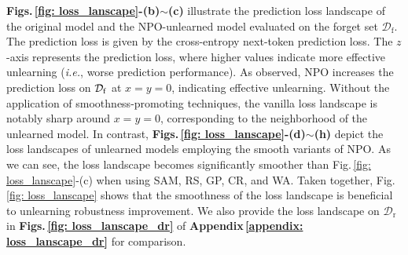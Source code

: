 \textbf{Figs.\,\ref{fig: loss_lanscape}-(b)$\sim$(c)} illustrate the prediction loss landscape of the original model and the NPO-unlearned model evaluated on the forget set $\mathcal{D}_\mathrm{f}$. The prediction loss is given by the cross-entropy next-token prediction loss. The $z$-axis represents the prediction loss, where higher values indicate more effective unlearning (\textit{i.e.}, worse prediction performance). As observed, NPO increases the prediction loss on $\mathcal{D_{\mathrm{f}}}$ at $x = y = 0$, 
indicating effective unlearning. %
Without the application of smoothness-promoting techniques, the vanilla loss landscape is notably sharp around $x = y = 0$, corresponding to the neighborhood of the unlearned model.
In contrast,  \textbf{Figs.\,\ref{fig: loss_lanscape}-(d)$\sim$(h)} depict the loss landscapes of unlearned models employing the smooth variants of NPO. As we can see, 
the loss landscape becomes significantly smoother than Fig.\,\ref{fig: loss_lanscape}-(c) when using SAM, RS, GP, CR, and WA.
%
Taken together,  Fig.\,\ref{fig: loss_lanscape} shows that the smoothness of the loss landscape is beneficial to unlearning robustness improvement. We also provide the loss landscape on $\mathcal{D}_{\mathrm{r}}$ in \textbf{Figs.\,\ref{fig: loss_lanscape_dr}} of \textbf{Appendix\,\ref{appendix: loss_lanscape_dr}} for comparison.



























